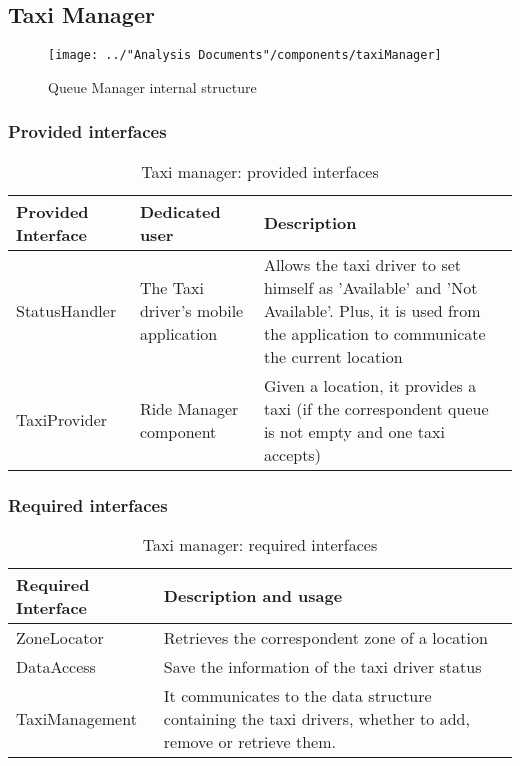 \subsection{Taxi Manager}
\begin{figure}[H]
	\centering
	\texttt{[image: ../"Analysis Documents"/components/taxiManager]}
	\label{fig:taximanager}
	\caption{Queue Manager internal structure}
\end{figure}
\subsubsection{Provided interfaces}
\begin{table}[H]
	\begin{longtable}{| p{} | p{} | p{} |}
		\hline
		\textbf{Provided Interface} & \textbf{Dedicated user} & \textbf{Description} \\ \hline
		StatusHandler & The Taxi driver's mobile application & Allows the taxi driver to set himself as 'Available' and 'Not Available'. Plus, it is used from the application to communicate the current location \\ \hline
		TaxiProvider & Ride Manager component & Given a location, it provides a taxi (if the correspondent queue is not empty and one taxi accepts) \\ \hline
	\end{longtable}
	\caption{Taxi manager: provided interfaces}
	\label{tab:taximanager:providedInterfaces}
\end{table}
\subsubsection{Required interfaces}
\begin{table}[H]
	\begin{longtable}{| l | p{} |}
		\hline
		\textbf{Required Interface} & \textbf{Description and usage} \\ \hline
		ZoneLocator & Retrieves the correspondent zone of a location \\ \hline
		DataAccess & Save the information of the taxi driver status \\ \hline
		TaxiManagement & It communicates to the data structure containing the taxi drivers, whether to add, remove or retrieve them. \\ \hline
	\end{longtable}
	\caption{Taxi manager: required interfaces}
	\label{tab:taximanager:requiredInterfaces}
\end{table}
